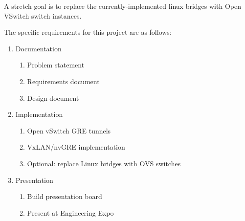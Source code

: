 \documentclass[10pt,letterpaper,onecolumn,draftclsnofoot]{IEEEtran}
\begin{document}
A stretch goal is to replace the currently-implemented linux bridges with
Open VSwitch switch instances.

The specific requirements for this project are as follows:

\begin{enumerate}
	\item Documentation
		\begin{enumerate}
			\item Problem statement
			\item Requirements document
			\item Design document
		\end{enumerate}
	\item Implementation
		\begin{enumerate}
			\item Open vSwitch GRE tunnels
			\item VxLAN/nvGRE implementation
			\item Optional: replace Linux bridges with OVS switches
		\end{enumerate}
	\item Presentation
		\begin{enumerate}
			\item Build presentation board
			\item Present at Engineering Expo
		\end{enumerate}
\end{enumerate}

\clearpage
\end{document}
